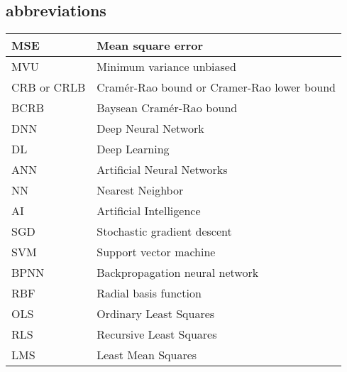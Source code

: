 \subsection{abbreviations}
\begin{xltabular}{\textwidth}{XX}
    MSE\cite{kayFundamentalsStatisticalSignal1993} & Mean square error \\ \hline
    MVU\cite{kayFundamentalsStatisticalSignal1993} & Minimum variance unbiased \\ \hline
    CRB\cite{vantreesDetectionEstimationModulation2004} or CRLB\cite{kayFundamentalsStatisticalProcessing2009} & Cramér-Rao bound or Cramer-Rao lower bound \\ \hline
    BCRB\cite{vantreesDetectionEstimationModulation2004} & Baysean Cramér-Rao bound \\ \hline
    DNN  & Deep Neural Network                                                                  \\ \hline
	DL   & Deep Learning                                                                        \\ \hline
	ANN  & Artificial Neural Networks \cite{goodfellowDeepLearning2016}                         \\ \hline
	NN   & Nearest Neighbor                                                                     \\ \hline
	AI   & Artificial Intelligence                                                              \\ \hline
	SGD  & Stochastic gradient descent                                                          \\ \hline
	SVM  & Support vector machine                                                               \\ \hline
	BPNN & Backpropagation neural network \cite{jiaoAutomaticEquatorialGPS2017}                 \\ \hline
	RBF  & Radial basis function                                                                \\ \hline
	OLS  & Ordinary Least Squares                                                               \\ \hline
	RLS  & Recursive Least Squares                                                              \\ \hline
	LMS  & Least Mean Squares                                                                   \\ \hline
\end{xltabular}